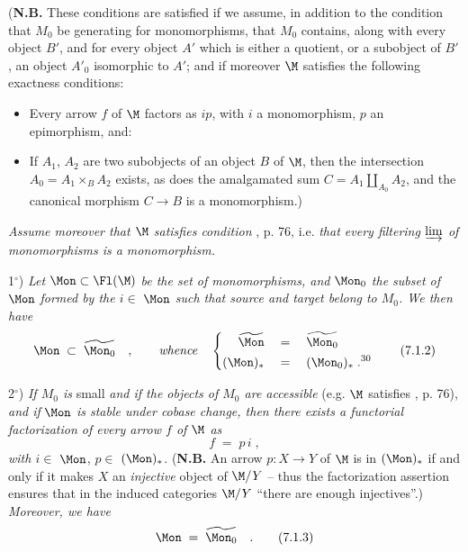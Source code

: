 (\textbf{N.B.} These conditions are satisfied if we assume, in addition to the condition that $M_0$ be generating for monomorphisms, that $M_0$ contains, along with every object $B'$, and for every object $A'$ which is either a quotient, or a subobject of $B'$, an object $A'_0$ isomorphic to $A'$; and if moreover $\M$ satisfies the following exactness conditions:
\begin{itemize}
\item[1$^{\circ}$)] Every arrow $f$ of $\M$ factors as $ip$, with $i$ a monomorphism, $p$ an epimorphism, and:
\item[2$^{\circ}$)] If $A_1$, $A_2$ are two subobjects of an object $B$ of $\M$, then the intersection $A_0 = A_1 \times_B A_2$ exists, as does the
amalgamated sum $C = A_1 \amalg_{A_0} A_2$, and the canonical morphism $C \longrightarrow B$ is a monomorphism.)
\end{itemize}

\textit{Assume moreover that $\M$ satisfies condition} , p. 76, i.e. \textit{that every filtering $\varinjlim$ of monomorphisms is a monomorphism.}

1$^{\circ}$) \textit{Let} $\Mon \subset \Fl(\M)$ \textit{be the set of monomorphisms, and} $\Mon_0$ \textit{the subset of} $\Mon$ \textit{formed by the $i \in$} $\Mon$ \textit{such that source and target belong to $M_0$. We then have}
\[
\Mon \;\subset\; \widetilde{\Mon_0} \quad , \qquad \text{\textit{whence}} \quad
\left\{
\begin{aligned}
\widetilde{\Mon} \quad &= \quad \widetilde{\Mon_0} \\
(\Mon)_{*} \quad &= \quad (\Mon_0)_{*} \;.\text{\footnotemark[30]}
\end{aligned}
\right.
\tag*{(7.1.2)}
\]

2$^{\circ}$) \textit{If $M_0$ is} small \textit{and if the objects of $M_0$ are accessible} (e.g. $\M$ satisfies , p. 76), \textit{and if} $\Mon$ \textit{is stable under cobase change, then there exists a functorial factorization of every arrow $f$ of $\M$ as}
\[
f \;=\; p\, i \;,
\]
\textit{with $i \in$} $\Mon$, \textit{$p \in$} $(\Mon)_{*}$. (\textbf{N.B.} An arrow $p : X \longrightarrow Y$ of $\M$ is in $(\Mon)_{*}$ if and only if it makes $X$ an \textit{injective} object of $\M/Y$ -- thus the factorization assertion ensures that in the induced categories $\M/Y$ ``there are enough injectives''.) \textit{Moreover, we have}
\[
\Mon \;=\; \widetilde{\Mon_0} \quad .
\tag*{(7.1.3)}
\]

